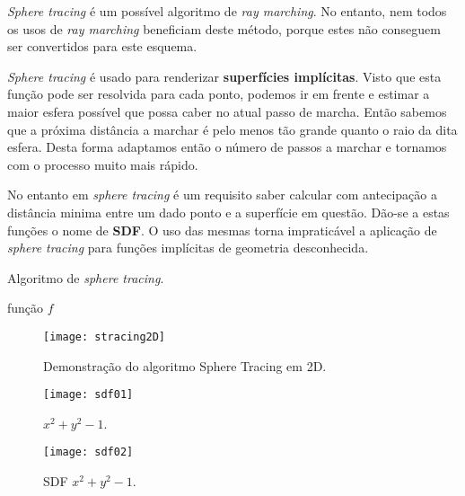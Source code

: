 
\textit{Sphere tracing} é um possível algoritmo de \textit{ray marching}. No entanto, nem todos os usos de \textit{ray marching} beneficiam deste método, porque estes não conseguem ser convertidos para este esquema.

\textit{Sphere tracing} é usado para renderizar \textbf{superfícies implícitas}. Visto que esta função pode ser resolvida para cada ponto, podemos ir em frente e estimar a maior esfera possível que possa caber no atual passo de marcha. Então sabemos que a próxima distância a marchar é pelo menos tão grande quanto o raio da dita esfera. Desta forma adaptamos então o número de passos a marchar e tornamos com o processo muito mais rápido.

No entanto em \textit{sphere tracing} é um requisito saber calcular com antecipação a distância minima entre um dado ponto e a superfície em questão. Dão-se a estas funções o nome de \textbf{\ac{SDF}}. O uso das mesmas torna impraticável a aplicação de \textit{sphere tracing} para funções implícitas de geometria desconhecida.

\begin{algorithm}[!htbp]
	\caption{Algoritmo de \textit{sphere tracing}.}
	\label{alg::raymarch_spheretrace}
	\begin{algorithmic}
		\Require função $f$      
	\end{algorithmic}
\end{algorithm}

\begin{figure}[!htbp]
	\centering
	\texttt{[image: stracing2D]}
	\caption[Demonstração do algoritmo Sphere Tracing em 2D]{Demonstração do algoritmo Sphere Tracing em 2D.}
	\label{fig::stracing2D}
\end{figure}

\begin{figure}[!htbp]
	\centering
	\texttt{[image: sdf01]}
	\caption[]{$x^2 + y^2 - 1$.}
	\label{fig::sdf01}
\end{figure}

\begin{figure}[!htbp]
	\centering
	\texttt{[image: sdf02]}
	\caption[]{\acf{SDF} $x^2 + y^2 - 1$.}
	\label{fig::sdf02}
\end{figure}

